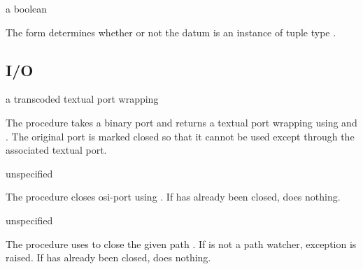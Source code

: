 \begin{syntax}
\end{syntax}
\returns{} a boolean

The  form determines whether or not the datum  is
an instance of tuple type .

\subsection {I/O}

\begin{procedure}
\end{procedure}
\returns{} a transcoded textual port wrapping 

The  procedure takes a binary port  and
returns a textual port wrapping  using
 and . The
original port  is marked closed so that it cannot be used
except through the associated textual port.

\begin{procedure}
\end{procedure}
\returns{} unspecified

The  procedure closes osi-port  using
. If  has already been closed,
 does nothing.

\begin{procedure}
\end{procedure}
\returns{} unspecified

The  procedure uses
 to close the given path
. If  is not a path
watcher, exception 
is raised. If  has already been closed,
 does nothing.

